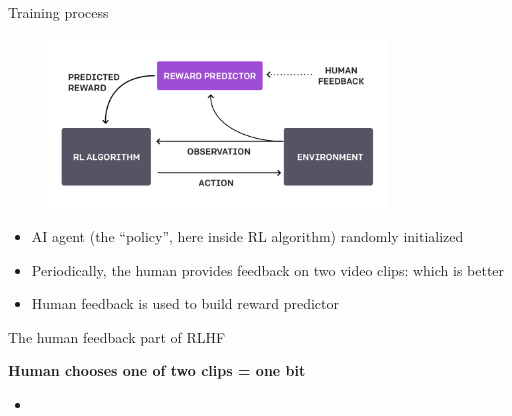\begin{vbframe}{Training process}

\vfill

\begin{figure}
\centering
\includegraphics[width = 9cm]{figure/trainingprocess.png}
\end{figure}

\begin{itemize}
	\item AI agent (the ``policy'', here inside RL
	algorithm) randomly initialized
	\item Periodically, the human provides feedback on
	two video clips: which is better
        \item Human feedback is used to build reward predictor
\end{itemize}

\vfill

\end{vbframe}


\begin{vbframe}{The human feedback part of RLHF}

\vfill

\textbf{Human chooses one of two clips = one bit}

	\begin{itemize}
		\item \href{https://player.vimeo.com/video/754042470?h=e64a40690d&badge=0&autopause=0&player_id=0&app_id=58479}{}

	\end{itemize}

\vfill

\end{vbframe}




